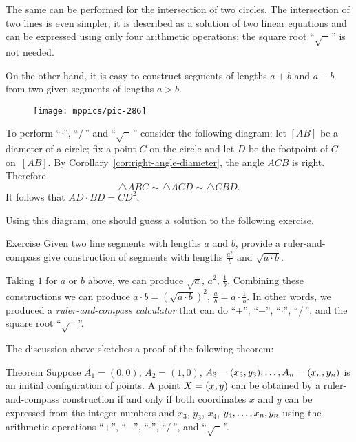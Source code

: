 The same can be performed for the intersection of two circles. 
The intersection of two lines is even simpler; 
it is described as a solution of two linear equations and can be expressed using only four arithmetic operations;
the square root ``$\sqrt{\phantom{a}}\,$'' is not needed.

\medskip

On the other hand, it is easy to construct segments of lengths $a+b$ and $a-b$ from two given segments of lengths $a>b$.

\begin{wrapfigure}{r}{37mm}
\vskip-6mm
\centering
\texttt{[image: mppics/pic-286]}
\end{wrapfigure}

To perform ``$\cdot$'', ``$/\,$''
and ``$\sqrt{\phantom{a}}\,$'' consider the following diagram:
let $[AB]$ be a diameter of a circle; 
fix a point $C$ on the circle and let $D$ be the footpoint of $C$ on~$[AB]$.
By Corollary~\ref{cor:right-angle-diameter}, the angle $ACB$ is right.
Therefore 
$$\triangle ABC\sim\triangle ACD\sim \triangle CBD.$$
It follows that $AD\cdot BD=CD^2$. 

Using this diagram, one should guess a solution to the following exercise.

\begin{thm}{Exercise}\label{ex:a2/b}
Given two line segments with lengths $a$ and $b$, provide a ruler-and-compass give construction of segments with lengths $\tfrac {a^2}b$ and $\sqrt{a\cdot b}$.
\end{thm}


Taking $1$ for $a$ or $b$ above, we can produce 
$\sqrt a$, $a^2$, $\tfrac1b$.
Combining these constructions we can produce
$a\cdot b=(\sqrt{a\cdot b})^2$,
$\tfrac ab=a\cdot\tfrac 1b$.
In other words, we produced a \emph{ruler-and-compass calculator} that can do ``$+$'', ``$-$'', ``$\cdot$'', ``$/\,$'', and the square root ``$\sqrt{\phantom{a}}\,$''.

The discussion above sketches a proof of the following theorem:
 
\begin{thm}{Theorem}\label{thm:constructible-numbers}
Suppose $A_1=(0,0)$, $A_2=(1,0)$, $A_3=(x_3,y_3),\dots,A_n=(x_n,y_n)$ is 
an initial configuration of points.
A point $X=(x,y)$ can be obtained by a ruler-and-compass construction
if and only if both coordinates $x$ and $y$ can be expressed from the integer numbers and $x_3$, $y_3$, $x_4$, $y_4,\dots,x_n,y_n$ using the arithmetic operations ``$+$'', ``$-$'', ``$\cdot$'', ``$/\,$'', and ``$\sqrt{\phantom{a}}\,$''.
\end{thm}

